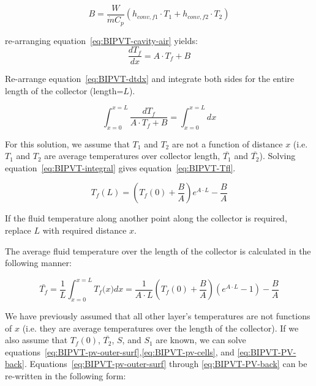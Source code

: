 {\begin{equation}
B=\frac{W}{\dot{m}C_p}\left(h_{conv,f1}\cdot T_1+h_{conv,f2}\cdot T_2\right)		
\label{eq:BIPVT-B}
\end{equation}

re-arranging equation~\ref{eq:BIPVT-cavity-air} yields:
\begin{equation}
\frac{dT_f}{dx}=A\cdot T_f+B 	
\label{eq:BIPVT-dtdx}
\end{equation}

Re-arrange equation~\ref{eq:BIPVT-dtdx} and integrate both sides for the entire length of the collector (length=\(L\)).

\begin{equation}
\int_{x=0}^{x=L}{\frac{dT_f}{{A\cdot T}_f+B}=\int_{x=0}^{x=L}dx}	
\label{eq:BIPVT-integral}
\end{equation}

For this solution, we assume that \(T_{1}\) and \(T_{2}\) are not a function of distance \(x\) (i.e. \(T_{1}\) and \(T_{2}\) are average temperatures over collector length, \(\bar{T_{1}}\) and \(\bar{T_{2}}\)). Solving equation~\ref{eq:BIPVT-integral} gives equation~\ref{eq:BIPVT-Tfl}.

\begin{equation}
T_f(L)=\left(T_f(0)+\frac{B}{A}\right)e^{A\cdot L}-\frac{B}{A}
\label{eq:BIPVT-Tfl}
\end{equation}

If the fluid temperature along another point along the collector is required, replace \(L\) with required distance \(x\).

The average fluid temperature over the length of the collector is calculated in the following manner:

\begin{equation}
\bar{T_f}=\frac{1}{L}\int_{x=0}^{x=L}{T_f(x})dx=\frac{1}{A\cdot L}\left(T_f\left(0\right)+\frac{B}{A}\right)\left(e^{A\cdot L}-1\right)-\frac{B}{A}
\label{eq:BIPVT-tfl-avg}
\end{equation}

We have previously assumed that all other layer's temperatures are not functions of \(x\) (i.e. they are average temperatures over the length of the collector). If we also assume that \(T_{f}(0)\), \(\bar{T_{2}}\), \(S\), and \(S_{1}\) are known, we can solve equations~\ref{eq:BIPVT-pv-outer-surf},\ref{eq:BIPVT-pv-cells}, and \ref{eq:BIPVT-PV-back}. Equations~\ref{eq:BIPVT-pv-outer-surf} through \ref{eq:BIPVT-PV-back} can be re-written in the following form:

}

